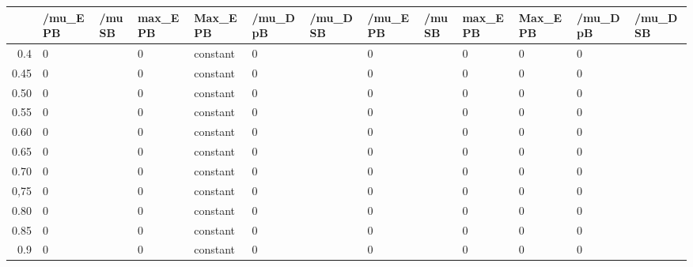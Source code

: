\begin{table}[ht]
\centering
\begin{tabular}{rllllllllllll}
  \hline
 & /mu\_E PB & /mu SB & max\_E PB & Max\_E PB & /mu\_D pB & /mu\_D SB & /mu\_E PB & /mu SB & max\_E PB & Max\_E PB & /mu\_D pB & /mu\_D SB \\ 
  \hline
0.4 & 0 &  & 0 & constant & 0 &  & 0 &  & 0 & 0 & 0 &  \\ 
  0.45 & 0 &  & 0 & constant & 0 &  & 0 &  & 0 & 0 & 0 &  \\ 
  0.50 & 0 &  & 0 & constant & 0 &  & 0 &  & 0 & 0 & 0 &  \\ 
  0.55 & 0 &  & 0 & constant & 0 &  & 0 &  & 0 & 0 & 0 &  \\ 
  0.60 & 0 &  & 0 & constant & 0 &  & 0 &  & 0 & 0 & 0 &  \\ 
  0.65 & 0 &  & 0 & constant & 0 &  & 0 &  & 0 & 0 & 0 &  \\ 
  0.70 & 0 &  & 0 & constant & 0 &  & 0 &  & 0 & 0 & 0 &  \\ 
  0,75 & 0 &  & 0 & constant & 0 &  & 0 &  & 0 & 0 & 0 &  \\ 
  0.80 & 0 &  & 0 & constant & 0 &  & 0 &  & 0 & 0 & 0 &  \\ 
  0.85 & 0 &  & 0 & constant & 0 &  & 0 &  & 0 & 0 & 0 &  \\ 
  0.9 & 0 &  & 0 & constant & 0 &  & 0 &  & 0 & 0 & 0 &  \\ 
   \hline
\end{tabular}
\end{table}
